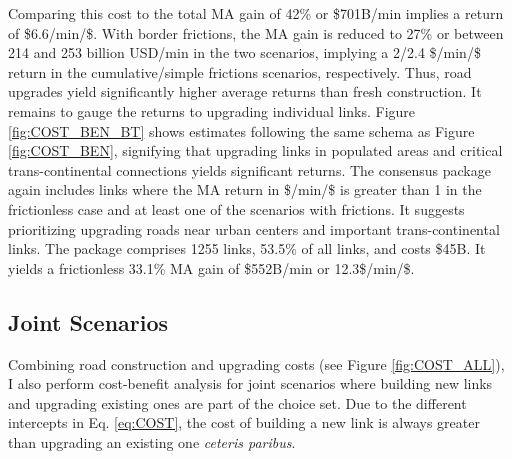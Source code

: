 \documentclass[a4paper]{article}
\begin{document}
Comparing this cost to the total MA gain of 42\% or \$701B/min implies a return of \$6.6/min/\$. With border frictions, the MA gain is reduced to 27\% or between 214 and 253 billion USD/min in the two scenarios, implying a 2/2.4 \$/min/\$ return in the cumulative/simple frictions scenarios, respectively. Thus, road upgrades yield significantly higher average returns than fresh construction. \newline  
It remains to gauge the returns to upgrading individual links. Figure \ref{fig:COST_BEN_BT} shows estimates following the same schema as Figure \ref{fig:COST_BEN}, signifying that upgrading links in populated areas and critical trans-continental connections yields significant returns. The consensus package again includes links where the MA return in \$/min/\$ is greater than 1 in the frictionless case and at least one of the scenarios with frictions. It suggests prioritizing upgrading roads near urban centers and important trans-continental links. The package comprises 1255 links, 53.5\% of all links, and costs \$45B. It yields a frictionless 33.1\% MA gain of \$552B/min or 12.3\$/min/\$. 


\subsection{Joint Scenarios} %

Combining road construction and upgrading costs (see Figure \ref{fig:COST_ALL}), I also perform cost-benefit analysis for joint scenarios where building new links and upgrading existing ones are part of the choice set. Due to the different intercepts in Eq. \ref{eq:COST}, the cost of building a new link is always greater than upgrading an existing one \textit{ceteris paribus}. \newline
\end{document}
